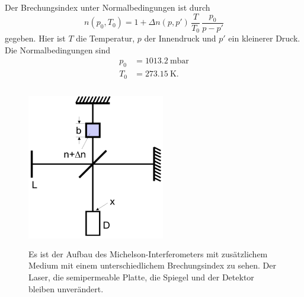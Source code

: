 \noindent Der Brechungsindex unter Normalbedingungen ist durch
\begin{equation}
    n(p_0, T_0) = 1 + \Delta n(p,p') \, \frac{T}{T_0} \, \frac{p_0}{p - p'}
    \label{eqn:n}
\end{equation}
gegeben. Hier ist $T$ die Temperatur, $p$ der Innendruck und $p'$ ein kleinerer Druck.
Die Normalbedingungen sind
\begin{align*}
    p_0 &= \SI{1013.2}{\milli\bar} \\
    T_0 &= \SI{273.15}{\kelvin}.
\end{align*}

\begin{figure}
    \centering
    \includegraphics[width=6cm, height=7cm]{build/michelson2.png}
    \caption{Es ist der Aufbau des Michelson-Interferometers mit zusätzlichem Medium mit einem unterschiedlichem Brechungsindex zu sehen. Der Laser, die semipermeable Platte, die Spiegel und der Detektor bleiben unverändert. \cite{V401}}
    \label{fig:michelson2}
\end{figure}



